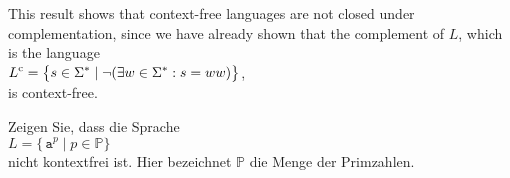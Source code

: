 \remarkEng
This result  shows that context-free languages are not closed under complementation, since we have
already shown that the complement of $L$, which is the language
\\[0.2cm]
\hspace*{1.3cm}
$\displaystyle L^{\mathrm{c}} = \bigl\{ s \in \Sigma^* \mid \neg(\exists w\in\Sigma^*: s = ww)\bigr\}$,
\\[0.2cm]
is context-free. \eox
\pagebreak

\exercise
Zeigen Sie, dass die Sprache 
\\[0.2cm]
\hspace*{1.3cm}
$L = \bigl\{ \,\mathtt{a}^{p} \;\big|\; p \in \mathbb{P} \bigr\}$
\\[0.2cm]
nicht kontextfrei ist.  Hier bezeichnet $\mathbb{P}$ die Menge der Primzahlen.
\eox

